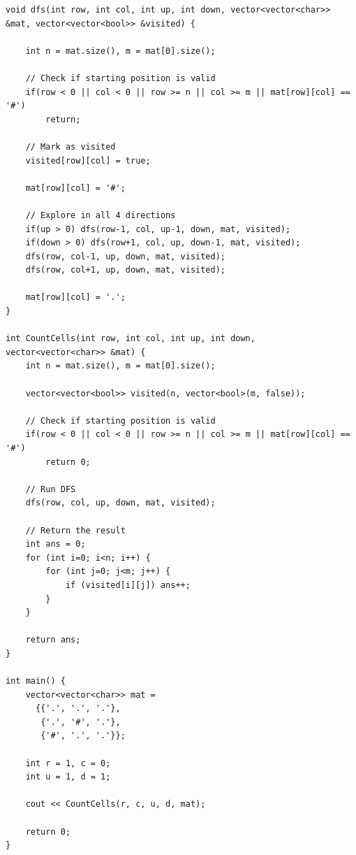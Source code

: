 \documentclass[a4paper,12pt]{article}
\begin{document}
\begin{tcolorbox}[breakable, enhanced, colback=white, title={Main Functions}, colframe=gray!40]
\begin{lstlisting}
void dfs(int row, int col, int up, int down, vector<vector<char>> &mat, vector<vector<bool>> &visited) {
            
    int n = mat.size(), m = mat[0].size();        
            
    // Check if starting position is valid 
    if(row < 0 || col < 0 || row >= n || col >= m || mat[row][col] == '#')
        return;
    
    // Mark as visited
    visited[row][col] = true;
    
    mat[row][col] = '#';
    
    // Explore in all 4 directions
    if(up > 0) dfs(row-1, col, up-1, down, mat, visited);
    if(down > 0) dfs(row+1, col, up, down-1, mat, visited);
    dfs(row, col-1, up, down, mat, visited);
    dfs(row, col+1, up, down, mat, visited);
    
    mat[row][col] = '.';
}

int CountCells(int row, int col, int up, int down, vector<vector<char>> &mat) {
    int n = mat.size(), m = mat[0].size();
    
    vector<vector<bool>> visited(n, vector<bool>(m, false));
    
    // Check if starting position is valid
    if(row < 0 || col < 0 || row >= n || col >= m || mat[row][col] == '#')
        return 0;
    
    // Run DFS
    dfs(row, col, up, down, mat, visited);
    
    // Return the result 
    int ans = 0;
    for (int i=0; i<n; i++) {
        for (int j=0; j<m; j++) {
            if (visited[i][j]) ans++;
        }
    }
    
    return ans;
}

int main() {
    vector<vector<char>> mat = 
      {{'.', '.', '.'},
       {'.', '#', '.'},
       {'#', '.', '.'}};
       
    int r = 1, c = 0;
    int u = 1, d = 1;
    
    cout << CountCells(r, c, u, d, mat);
    
    return 0;
}
\end{lstlisting}
\end{tcolorbox}
\vspace{1em}
\end{document}
